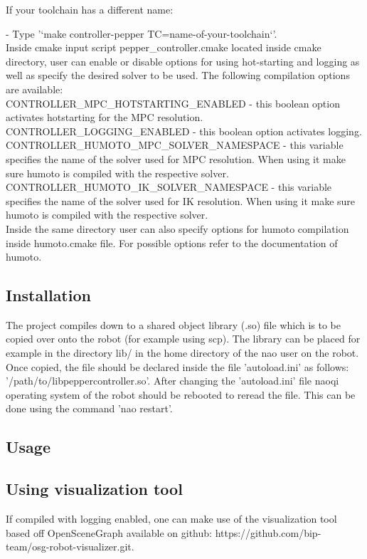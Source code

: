 \noindent If your toolchain has a different name:

- Type '`make controller-pepper TC=name-of-your-toolchain`'.\\

\noindent Inside cmake input script pepper\_controller.cmake located inside cmake directory, user can enable or disable
options for using hot-starting and logging as well as specify the desired solver to be used. The following compilation
options are available:\\

\noindent CONTROLLER\_MPC\_HOTSTARTING\_ENABLED - this boolean option activates hotstarting for the MPC resolution.\\
\noindent CONTROLLER\_LOGGING\_ENABLED - this boolean option activates logging.\\
\noindent CONTROLLER\_HUMOTO\_MPC\_SOLVER\_NAMESPACE - this variable specifies the name of the solver used for MPC resolution. 
When using it make sure humoto is compiled with the respective solver.\\
\noindent CONTROLLER\_HUMOTO\_IK\_SOLVER\_NAMESPACE - this variable specifies the name of the solver used for IK resolution. 
When using it make sure humoto is compiled with the respective solver.\\

\noindent Inside the same directory user can also specify options for humoto compilation inside humoto.cmake file.
For possible options refer to the documentation of humoto.

\subsection{Installation}
\noindent The project compiles down to a shared object library (.so) file which is to be copied over onto the robot (for example
using scp). The library can be placed for example in the directory lib/ in the home directory of the nao user on the
robot. Once copied, the file should be declared inside the file 'autoload.ini' as follows:
'/path/to/libpeppercontroller.so'. After changing the 'autoload.ini' file naoqi operating system of the robot should be
rebooted to reread the file. This can be done using the command 'nao restart'.

\subsection{Usage}

\subsection{Using visualization tool}
\noindent If compiled with logging enabled, one can make use of the visualization tool based off OpenSceneGraph
available on github: https://github.com/bip-team/osg-robot-visualizer.git.
